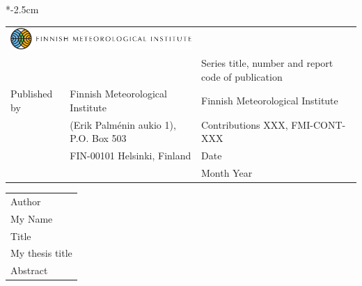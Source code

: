 \documentclass[11pt,b5paper]{book}
\newenvironment{changemargin}[3]{%
\begin{list}{}{
\setlength{\topsep}{0pt}
\setlength{\leftmargin}{#1}
\setlength{\rightmargin}{#2}
\setlength{\listparindent}{\parindent}
\setlength{\itemindent}{\parindent}
\setlength{\parsep}{\parskip}
}
\item[]}{\end{list}}
\begin{document}
\newpage
\thispagestyle{empty}


\begin{changemargin}{-9mm}{-5mm}

\vspace*{-2.5cm}

\footnotesize

\begin{flushleft}
\begin{tabular}{@{}p{2cm} p{47mm} l}
  \multicolumn{2}{l}{\hspace{-6mm} \includegraphics[width=7cm]{images/eng_cmyk.pdf}} & \\ 
  & &  {\scriptsize Series title, number and report code of publication} \\
  \hspace{-7mm}Published by & \hspace{-7mm}Finnish Meteorological Institute & Finnish Meteorological Institute \\
  & \hspace{-7mm}(Erik Palm\'enin aukio 1), P.O. Box 503 & Contributions XXX, FMI-CONT-XXX \\
  & \hspace{-7mm }FIN-00101 Helsinki, Finland & {\scriptsize Date} \\
  & & Month Year \\
\end{tabular}
\end{flushleft}

\begin{flushleft}
\begin{tabular}{p{140mm}}
  \hline
  {\scriptsize Author} \\
  My Name \\
  \hline
  {\scriptsize Title} \\
  My thesis title \\
  \hline
  {\scriptsize Abstract} \\
\end{tabular}
\end{flushleft}


\end{changemargin}
\end{document}
